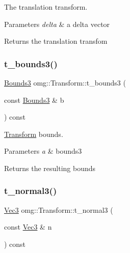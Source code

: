 The translation transform. 


\begin{DoxyParams}{Parameters}
{\em delta} & a delta vector \\
\hline
\end{DoxyParams}
\begin{DoxyReturn}{Returns}
the translation transfom 
\end{DoxyReturn}
\mbox{\label{classomg_1_1_transform_a5a4c1f700874ad7325bf58b3320f45c1}} 
\subsubsection{\texorpdfstring{t\_bounds3()}{t\_bounds3()}}
{\footnotesize\ttfamily \mbox{\hyperlink{classomg_1_1_bounds3}{Bounds3}} omg\+::\+Transform\+::t\+\_\+bounds3 (\begin{DoxyParamCaption}\item[{const \mbox{\hyperlink{classomg_1_1_bounds3}{Bounds3}} \&}]{b }\end{DoxyParamCaption}) const\hspace{0.3cm}{\ttfamily [inline]}}



\mbox{\hyperlink{classomg_1_1_transform}{Transform}} bounds. 


\begin{DoxyParams}{Parameters}
{\em a} & bounds3 \\
\hline
\end{DoxyParams}
\begin{DoxyReturn}{Returns}
the resulting bounds 
\end{DoxyReturn}
\mbox{\label{classomg_1_1_transform_a3b9a9ce03a3eeeaac14c6393c50dfcd9}} 
\subsubsection{\texorpdfstring{t\_normal3()}{t\_normal3()}}
{\footnotesize\ttfamily \mbox{\hyperlink{namespaceomg_a45a9482677fee9933ff369b49894e316}{Vec3}} omg\+::\+Transform\+::t\+\_\+normal3 (\begin{DoxyParamCaption}\item[{const \mbox{\hyperlink{namespaceomg_a45a9482677fee9933ff369b49894e316}{Vec3}} \&}]{n }\end{DoxyParamCaption}) const\hspace{0.3cm}{\ttfamily [inline]}}



